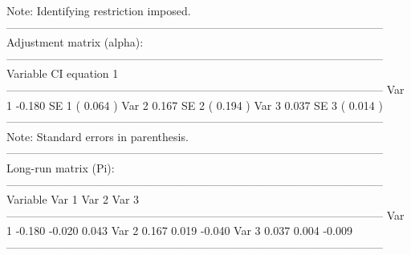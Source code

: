 \documentclass[article]{jss}
\begin{document}
\begin{CodeChunk}
\begin{CodeOutput}
Note: Identifying restriction imposed.                                                               
-----------------------------------------------------------------------------------------------------
    Adjustment matrix (alpha):                                                                         
-----------------------------------------------------------------------------------------------------
      Variable        CI equation 1  
-----------------------------------------------------------------------------------------------------
        Var 1            -0.180     
         SE 1         (   0.064  )  
        Var 2             0.167     
         SE 2         (   0.194  )  
        Var 3             0.037     
         SE 3         (   0.014  )  
-----------------------------------------------------------------------------------------------------
Note: Standard errors in parenthesis.                                                                
-----------------------------------------------------------------------------------------------------
    Long-run matrix (Pi):                                                                       
-----------------------------------------------------------------------------------------------------
      Variable         Var 1          Var 2          Var 3   
-----------------------------------------------------------------------------------------------------
      Var 1           -0.180         -0.020          0.043    
      Var 2            0.167          0.019         -0.040    
      Var 3            0.037          0.004         -0.009    
-----------------------------------------------------------------------------------------------------


\end{CodeOutput}
\end{CodeChunk}
\end{document}
